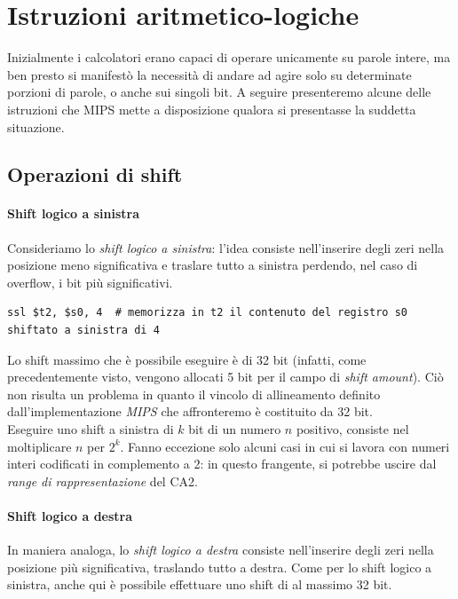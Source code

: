 \documentclass[class=book, crop=false]{standalone}
\begin{document}
\section{Istruzioni aritmetico-logiche}

Inizialmente i calcolatori erano capaci di operare unicamente su parole intere, ma ben presto si manifestò la necessità di andare ad agire solo su determinate porzioni di parole, o anche sui singoli bit. A seguire presenteremo alcune delle istruzioni che MIPS mette a disposizione qualora si presentasse la suddetta situazione.

\subsection{Operazioni di shift}

\paragraph{Shift logico a sinistra}
Consideriamo lo \emph{shift logico a sinistra}: l'idea consiste nell'inserire degli zeri nella posizione meno significativa e traslare tutto a sinistra perdendo, nel caso di overflow, i bit più significativi.

\begin{verbatim}
ssl $t2, $s0, 4  # memorizza in t2 il contenuto del registro s0 shiftato a sinistra di 4
\end{verbatim}

Lo shift massimo che è possibile eseguire è di 32 bit (infatti, come precedentemente visto, vengono allocati 5 bit per il campo di \emph{shift amount}). Ciò non risulta un problema in quanto il vincolo di allineamento definito dall'implementazione \emph{MIPS} che affronteremo è costituito da 32 bit.\\
Eseguire uno shift a sinistra di \(k\) bit di un numero \(n\) positivo, consiste nel moltiplicare \(n\) per \(2^k\). Fanno eccezione solo alcuni casi in cui si lavora con numeri interi codificati in complemento a 2: in questo frangente, si potrebbe uscire dal \emph{range di rappresentazione} del CA2.

\paragraph{Shift logico a destra}
In maniera analoga, lo \emph{shift logico a destra} consiste nell'inserire degli zeri nella posizione più significativa, traslando tutto a destra. Come per lo shift logico a sinistra, anche qui è possibile effettuare uno shift di al massimo 32 bit.
\end{document}
